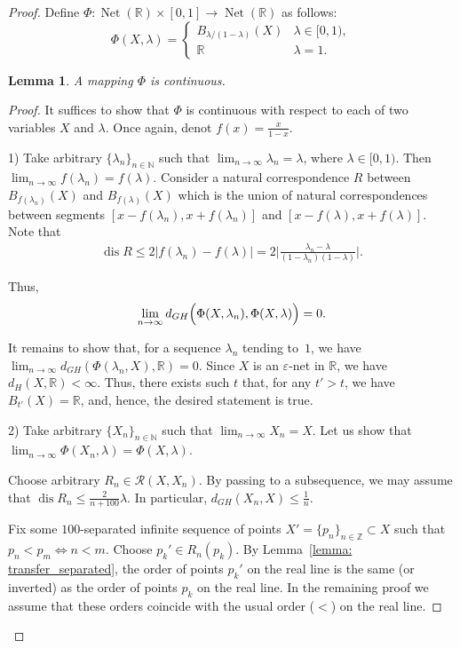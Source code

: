 \documentclass{article}
\newtheorem{lemma}{Lemma}[]
\theoremstyle{definition}
\theoremstyle{plain}
\newcommand{\dis}{\operatorname{dis}}
\renewcommand{\:}{\colon}
\newcommand{\0}{\emptyset}
\renewcommand{\(}{\rom(}
\renewcommand{\)}{\rom)}
\renewcommand{\ss}{\subset}
\newcommand{\N}{\mathbb{N}}
\newcommand{\R}{\mathbb{R}}
\newcommand{\Z}{\mathbb{Z}}
\newcommand{\nets}{\operatorname{Net}}
\begin{document}
\begin{proof}
Define $\Phi\: \nets(\R)\times [0, 1]\to \nets(\R)$ as follows: $$\Phi(X, \lambda) = \begin{cases}B_{\lambda/(1-\lambda)}(X) & \lambda\in[0, 1),\\ \R &\lambda = 1.\end{cases}$$ 

\begin{lemma}\label{lemma:contraction}
A mapping $\Phi$ is continuous. 
\end{lemma}

\begin{proof}
It suffices to show that $\Phi$ is continuous with respect to each of two variables $X$ and $\lambda$. Once again, denot $f(x) = \frac{x}{1-x}$.

1) Take arbitrary $\{\lambda_n\}_{n\in\N}$ such that $\displaystyle \lim_{n\to\infty}\lambda_n = \lambda$, where $\lambda\in[0, 1)$. Then $\displaystyle \lim_{n\to\infty}f(\lambda_n) = f(\lambda)$. Consider a natural correspondence $R$ between $B_{f(\lambda_n)}(X)$ and $B_{f(\lambda)}(X)$ which is the union of natural correspondences between segments $[x- f(\lambda_n), x+f(\lambda_n)]$ and $[x-f(\lambda), x + f(\lambda)]$. Note that 
\begin{align*}
\dis R\le 2|f(\lambda_n) - f(\lambda)| = 2\Big|\frac{\lambda_n - \lambda}{(1-\lambda_n)(1-\lambda)}\Big|. 
\end{align*}
 
Thus, $$\lim_{n\to\infty}d_{GH}\Bigl(\Phi(X,\lambda_n), \Phi(X, \lambda)\Bigr) = 0.$$

It remains to show that, for a sequence $\lambda_n$ tending to~$1$, we have $\displaystyle\lim_{n\to\infty} d_{GH}(\Phi(\lambda_n, X), \R) = 0$. Since $X$ is an $\varepsilon$-net in $\R$, we have $d_H(X, \R)<\infty$. Thus, there exists such $t$ that, for any $t' > t$, we have $B_{t'}(X) = \R$, and, hence, the desired statement is true.

2) Take arbitrary $\{X_n\}_{n\in\N}$ such that $\displaystyle \lim_{n\to\infty}X_n = X$. Let us show that $\displaystyle \lim_{n\to\infty}\Phi(X_n, \lambda) = \Phi(X,\lambda)$.

Choose arbitrary $R_n\in\mathcal{R}(X, X_n)$. By passing to a subsequence, we may assume that $\dis R_n \le \frac{2}{n+100}\lambda$. In particular, $d_{GH}(X_n, X)\le \frac{1}{n}$.

Fix some $100$-separated infinite sequence of points $X' = \{p_n\}_{n\in\Z}\ss X$ such that $p_n < p_m \Longleftrightarrow n < m$. Choose $p_k'\in R_n(p_k)$. By Lemma~\ref{lemma: transfer_separated}, the order of points $p_k'$ on the real line is the same (or inverted) as the order of points $p_k$ on the real line. In the remaining proof we assume that these orders coincide with the usual order ($<$) on the real line.


\end{proof}
\end{proof}
\end{document}
